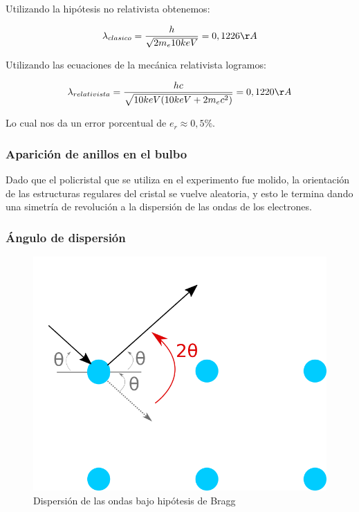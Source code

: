 \documentclass[]{article}
\begin{document}
Utilizando la hipótesis no relativista obtenemos:

\[\lambda_{clasico} = \frac{h}{\sqrt{2m_e 10keV}} = 0,1226 \AA\]

Utilizando las ecuaciones de la mecánica relativista logramos:

\[\lambda_{relativista} = \frac{hc}{\sqrt{10keV(10keV + 2m_ec^2)}}
= 0,1220 \AA\]

Lo cual nos da un error porcentual de \(e_r \approx 0,5\%\).

\hypertarget{apariciuxf3n-de-anillos-en-el-bulbo}{%
\subsubsection{Aparición de anillos en el
bulbo}\label{apariciuxf3n-de-anillos-en-el-bulbo}}

Dado que el policristal que se utiliza en el experimento fue molido, la
orientación de las estructuras regulares del cristal se vuelve
aleatoria, y esto le termina dando una simetría de revolución a la
dispersión de las ondas de los electrones.

\hypertarget{uxe1ngulo-de-dispersiuxf3n}{%
\subsubsection{Ángulo de dispersión}\label{uxe1ngulo-de-dispersiuxf3n}}

\begin{figure}[H]
\centering
\includegraphics{cuestionario_e.svg.png}
\caption{Dispersión de las ondas bajo hipótesis de Bragg}
\end{figure}
\end{document}
